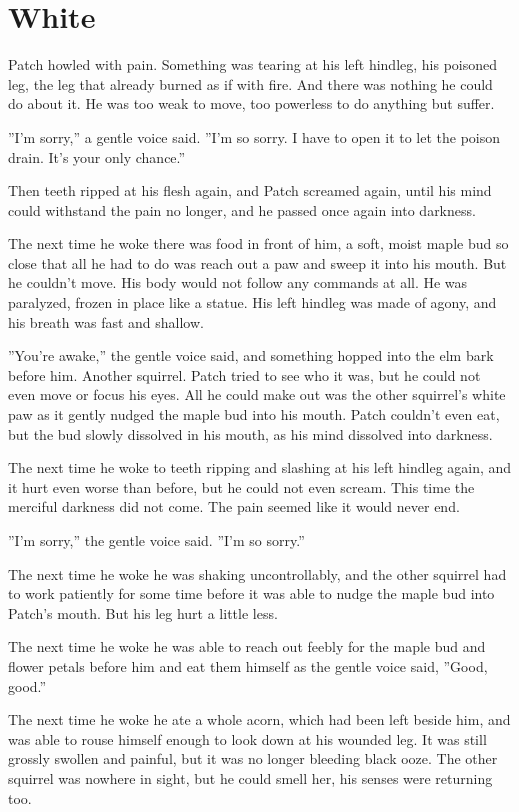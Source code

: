 \documentclass[12pt]{book}
\begin{document}
\section{White}

Patch howled with pain. Something was tearing at his left hindleg, his
poisoned leg, the leg that already burned as if with fire. And there
was nothing he could do about it. He was too weak to move, too
powerless to do anything but suffer.

''I'm sorry,'' a gentle voice said. ''I'm so sorry. I have to open it
to let the poison drain. It's your only chance.''

Then teeth ripped at his flesh again, and Patch screamed again, until
his mind could withstand the pain no longer, and he passed once again
into darkness.

The next time he woke there was food in front of him, a soft, moist
maple bud so close that all he had to do was reach out a paw and sweep
it into his mouth. But he couldn't move. His body would not follow any
commands at all. He was paralyzed, frozen in place like a statue. His
left hindleg was made of agony, and his breath was fast and shallow.

''You're awake,'' the gentle voice said, and something hopped into the
elm bark before him. Another squirrel. Patch tried to see who it was,
but he could not even move or focus his eyes. All he could make out
was the other squirrel's white paw as it gently nudged the maple bud
into his mouth. Patch couldn't even eat, but the bud slowly dissolved
in his mouth, as his mind dissolved into darkness.

The next time he woke to teeth ripping and slashing at his left
hindleg again, and it hurt even worse than before, but he could not
even scream. This time the merciful darkness did not come. The pain
seemed like it would never end.

''I'm sorry,'' the gentle voice said. ''I'm so sorry.''

The next time he woke he was shaking uncontrollably, and the other
squirrel had to work patiently for some time before it was able to
nudge the maple bud into Patch's mouth. But his leg hurt a little
less.

The next time he woke he was able to reach out feebly for the maple
bud and flower petals before him and eat them himself as the gentle
voice said, ''Good, good.''

The next time he woke he ate a whole acorn, which had been left beside
him, and was able to rouse himself enough to look down at his wounded
leg. It was still grossly swollen and painful, but it was no longer
bleeding black ooze. The other squirrel was nowhere in sight, but he
could smell her, his senses were returning too.
\end{document}
